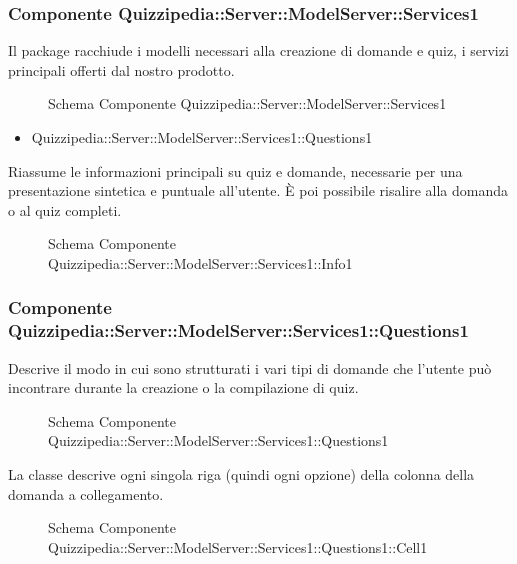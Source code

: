 \subsubsection{Componente Quizzipedia::Server::ModelServer::Services1}
Il package racchiude i modelli necessari alla creazione di domande e quiz, i servizi principali offerti dal nostro prodotto.
\begin{figure}[H]
\centering
\noindent{}
\caption{Schema Componente Quizzipedia::Server::ModelServer::Services1}
\end{figure}
\begin{itemize}
\item Quizzipedia::Server::ModelServer::Services1::Questions1
\end{itemize}
Riassume le informazioni principali su quiz e domande, necessarie per una presentazione sintetica e puntuale all'utente. È poi possibile risalire alla domanda o al quiz completi.
\begin{figure}[H]
\centering
\noindent{}
\caption{Schema Componente Quizzipedia::Server::ModelServer::Services1::Info1}
\end{figure}
\subsubsection{Componente Quizzipedia::Server::ModelServer::Services1::Questions1}
Descrive il modo in cui sono strutturati i vari tipi di domande che l'utente può incontrare durante la creazione o la compilazione di quiz.
\begin{figure}[H]
\centering
\noindent{}
\caption{Schema Componente Quizzipedia::Server::ModelServer::Services1::Questions1}
\end{figure}
La classe descrive ogni singola riga (quindi ogni opzione) della colonna della domanda a collegamento.
\begin{figure}[H]
\centering
\noindent{}
\caption{Schema Componente Quizzipedia::Server::ModelServer::Services1::Questions1::Cell1}
\end{figure}
